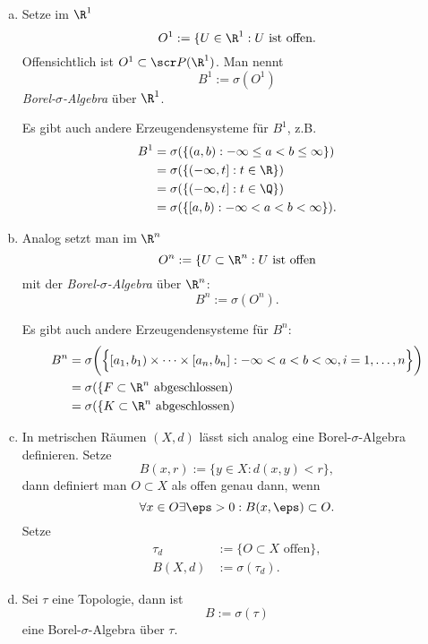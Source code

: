 \begin{ex} \label{1.1.6}
	\begin{enumerate}[(a)]
		\item
			Setze im $\R^1$
			\[
				O^1
				:= \{ U \in \R^1 : \text{$U$ ist offen}.
			\]
			Offensichtlich ist $O^1 \subset \scr P(\R^1)$.
			Man nennt
			\[
				B^1 := \sigma(O^1)
			\]
			\emph{Borel-$\sigma$-Algebra} über $\R^1$.

			Es gibt auch andere Erzeugendensysteme für $B^1$, z.B.
			\begin{align*}
				B^1
				&= \sigma(\{(a,b) : -\infty \le a < b \le \infty\}) \\
				&= \sigma(\{(-\infty,t] : t \in \R\}) \\
				&= \sigma(\{(-\infty,t] : t \in \Q\}) \\
				&= \sigma(\{[a,b) : -\infty < a < b < \infty \}). \\
			\end{align*}
		\item
			Analog setzt man im $\R^n$
			\[
				O^n
				:= \{ U \subset \R^n : \text{$U$ ist offen}
			\]
			mit der \emph{Borel-$\sigma$-Algebra} über $\R^n$:
			\[
				B^n := \sigma(O^n).
			\]

			Es gibt auch andere Erzeugendensysteme für $B^n$:
			\begin{align*}
				B^n
				&= \sigma \bigg( \Big\{ [a_1,b_1) \times \dotsb \times [a_n,b_n] : -\infty < a < b < \infty, i = 1, \dotsc, n \Big\} \bigg) \\
				&= \sigma( \{F \subset \R^n \text{ abgeschlossen} ) \\
				&= \sigma( \{K \subset \R^n \text{ abgeschlossen} )
			\end{align*}
		\item
			In metrischen Räumen $(X,d)$ lässt sich analog eine Borel-$\sigma$-Algebra definieren.
			Setze
			\[
				B(x,r) := \{ y \in X : d(x,y) < r \},
			\]
			dann definiert man $O \subset X$ als offen genau dann, wenn
			\[
				\forall x \in O \exists \eps > 0 : B(x,\eps) \subset O.
			\]
			Setze
			\begin{align*}
				\tau_d &:= \{ O \subset X \text{ offen} \}, \\
				B(X,d) &:= \sigma(\tau_d).
			\end{align*}
		\item
			Sei $\tau$ eine Topologie, dann ist
			\[
				B := \sigma(\tau)
			\]
			eine Borel-$\sigma$-Algebra über $\tau$.
	\end{enumerate}
\end{ex}

